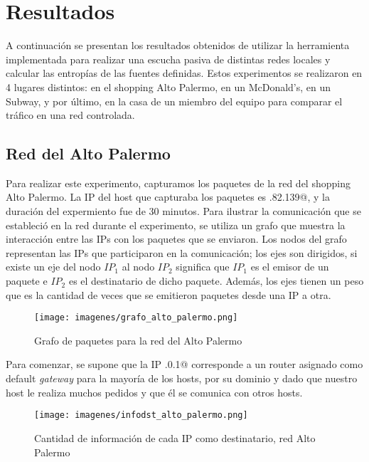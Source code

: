 \section{Resultados}

A continuaci\'on se presentan los resultados obtenidos de utilizar la herramienta implementada para
realizar una escucha pasiva de distintas redes locales y calcular las entrop\'ias de las fuentes 
definidas. Estos experimentos se realizaron en 4 lugares distintos: en el shopping Alto Palermo, en
un McDonald's, en un Subway, y por \'ultimo, en la casa de un miembro del equipo para comparar el 
tr\'afico en una red controlada.

\subsection{Red del Alto Palermo}

Para realizar este experimento, capturamos los paquetes de la red del shopping Alto Palermo. La IP 
del host que capturaba los paquetes es .82.139@, y la duraci\'on del expermiento fue de 
30 minutos. Para ilustrar la comunicaci\'on que se estableci\'o en la red durante el experimento,
se utiliza un grafo que muestra la interacci\'on entre las IPs con los paquetes que se enviaron. Los
nodos del grafo representan las IPs que participaron en la comunicaci\'on; los ejes son dirigidos, si
existe un eje del nodo $IP_1$ al nodo $IP_2$ significa que $IP_1$ es el emisor de un paquete e 
$IP_2$ es el destinatario de dicho paquete. Adem\'as, los ejes tienen un peso que es la cantidad
de veces que se emitieron paquetes desde una IP a otra. \\

\begin{figure}[htb]
\begin{center}
\texttt{[image: imagenes/grafo\_alto\_palermo.png]} 
\caption{Grafo de paquetes para la red del Alto Palermo} 
\end{center}
\end{figure}

Para comenzar, se supone que la IP .0.1@  corresponde a un router asignado como default 
\emph{gateway} para la mayor\'ia de los hosts, por su dominio y dado que nuestro host le realiza 
muchos pedidos y que \'el se comunica con otros hosts. 

\newpage

\begin{figure}[htb]
\begin{center}
\texttt{[image: imagenes/infodst\_alto\_palermo.png]} 
\caption{Cantidad de informaci\'on de cada IP como destinatario, red Alto Palermo} 
\end{center}
\end{figure}

